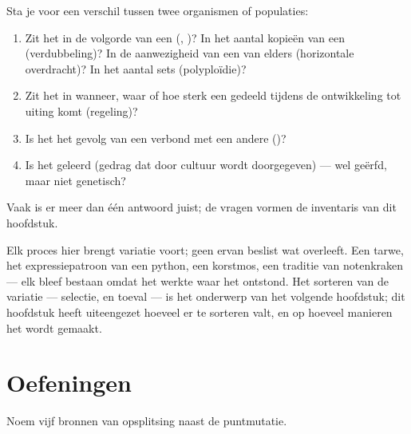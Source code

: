 \begin{method}\label{met:g12:diversification-of-life:name}
Sta je voor een verschil tussen twee organismen of populaties:
\begin{enumerate}
  \item Zit het in de volgorde van een  (, )? In het
        aantal kopieën van een  (verdubbeling)? In de aanwezigheid van
        een  van elders (horizontale overdracht)? In het aantal sets
         (polyploïdie)?
  \item Zit het in wanneer, waar of hoe sterk een gedeeld  tijdens de
        ontwikkeling tot uiting komt (regeling)?
  \item Is het het gevolg van een verbond met een andere 
        ()?
  \item Is het geleerd (gedrag dat door cultuur wordt doorgegeven) ---
        wel geërfd, maar niet genetisch?
\end{enumerate}
Vaak is er meer dan één antwoord juist; de vragen vormen de inventaris van
dit hoofdstuk.
\end{method}

\begin{remark}\label{rem:g12:diversification-of-life:selection}
Elk proces hier brengt variatie voort; geen ervan beslist wat overleeft.
Een  tarwe, het expressiepatroon van een python, een korstmos,
een traditie van notenkraken --- elk bleef bestaan omdat het werkte waar
het ontstond. Het sorteren van de variatie --- selectie, en toeval --- is
het onderwerp van het volgende hoofdstuk; dit hoofdstuk heeft uiteengezet
hoeveel er te sorteren valt, en op hoeveel manieren het wordt gemaakt.
\end{remark}

\section{Oefeningen}

\begin{exercise}[$\star$]\label{exo:g12:diversification-of-life:1}
Noem vijf bronnen van opsplitsing naast de puntmutatie.
\end{exercise}

